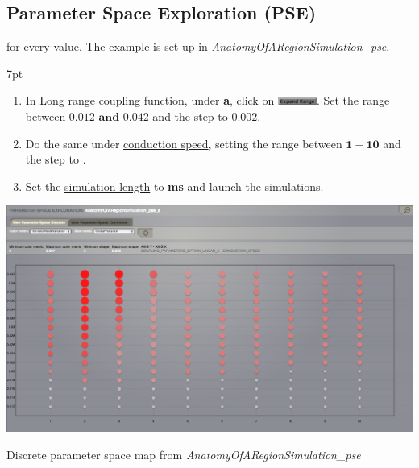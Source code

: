 \documentclass{tufte-handout}
\newenvironment{simulation}{%
  \def\FrameCommand{%
    \hspace{1pt}%
    {\color{ForestGreen}\vrule width 2pt}%
    {\color{simulationshade}\vrule width 4pt}%
    \colorbox{simulationshade}%
  }%
  \MakeFramed{\advance\hsize-\width\FrameRestore}%
  \noindent\hspace{-4.55pt}%
  \begin{adjustwidth}{}{7pt}%
  \vspace{2pt}\vspace{2pt}%
}
{%
  \vspace{2pt}\end{adjustwidth}\endMakeFramed%
}
\begin{document}
\newpage
\subsection{Parameter Space Exploration (PSE)}\label{sec:pse}

 for
every value.  The example is set up in \textit{AnatomyOfARegionSimulation\_pse}. 

\begin{simulation}
\begin{enumerate}
 \item In \underline{Long range coupling function}, under \textbf{a}, click on \includegraphics[width=0.1\textwidth]{butt_expand_range.png}. 
 Set the range between $\mathbf{0.012 \text{ and } 0.042}$ and the step to $\mathbf{0.002}$.
 \item Do the same under \underline{conduction speed}, setting the range between $\mathbf{1-10}$  and the step to \textbf{}.
 
 \item Set the \underline{simulation length} to \textbf{\unit[2000]{ms}} and launch the simulations.
\end{enumerate}
\end{simulation}

\begin{marginfigure}
  \includegraphics[width=\linewidth]{Handout_UI_BuildingYourOwnBrainNetworkModel_PSEDiscrete}%
  \caption{Discrete parameter space map from \textit{AnatomyOfARegionSimulation\_pse}}%
  \label{fig:pse_discrete}%
\end{marginfigure}
\end{document}
